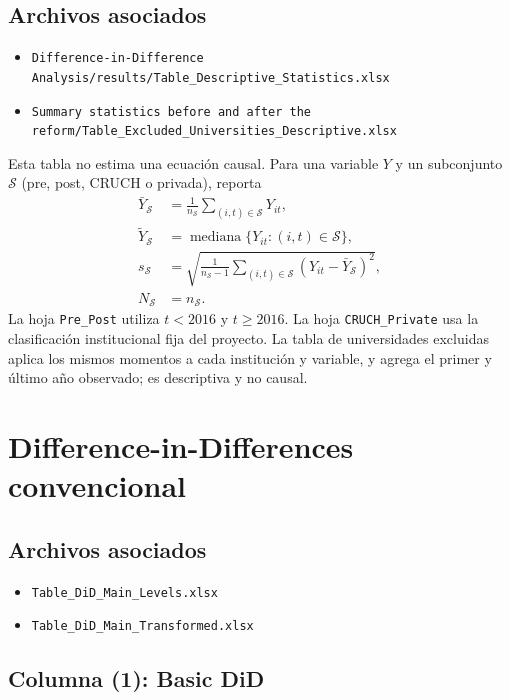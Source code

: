 \documentclass[11pt]{article}
\newcommand{\file}[1]{\texttt{#1}}
\begin{document}
\subsection*{Archivos asociados}
\begin{itemize}
 \item \file{Difference-in-Difference Analysis/results/Table\_Descriptive\_Statistics.xlsx}
 \item \file{Summary statistics before and after the reform/Table\_Excluded\_Universities\_Descriptive.xlsx}
\end{itemize}

Esta tabla no estima una ecuación causal. Para una variable $Y$ y un subconjunto
$\mathcal S$ (pre, post, CRUCH o privada), reporta
\begin{align}
 \bar Y_{\mathcal S}
 &=\frac{1}{n_{\mathcal S}}\sum_{(i,t)\in\mathcal S}Y_{it}, \\
 \widetilde Y_{\mathcal S}
 &=\operatorname{mediana}\{Y_{it}:(i,t)\in\mathcal S\}, \\
 s_{\mathcal S}
 &=\sqrt{\frac{1}{n_{\mathcal S}-1}
   \sum_{(i,t)\in\mathcal S}(Y_{it}-\bar Y_{\mathcal S})^2}, \\
 N_{\mathcal S}&=n_{\mathcal S}.
\end{align}
La hoja \file{Pre\_Post} utiliza $t<2016$ y $t\geq 2016$. La hoja
\file{CRUCH\_Private} usa la clasificación institucional fija del proyecto.
La tabla de universidades excluidas aplica los mismos momentos a cada
institución y variable, y agrega el primer y último año observado; es
descriptiva y no causal.

\section{Difference-in-Differences convencional}

\subsection*{Archivos asociados}
\begin{itemize}
 \item \file{Table\_DiD\_Main\_Levels.xlsx}
 \item \file{Table\_DiD\_Main\_Transformed.xlsx}
\end{itemize}

\subsection{Columna (1): Basic DiD}
\end{document}
